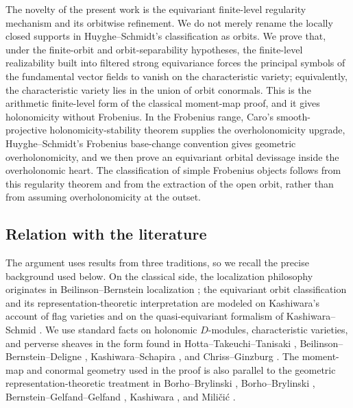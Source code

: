 \documentclass[11pt]{amsart}
\theoremstyle{plain}
\theoremstyle{definition}
\theoremstyle{remark}
\begin{document}
The novelty of the present work is the equivariant finite-level regularity
mechanism and its orbitwise refinement.  We do not merely rename the locally
closed supports in Huyghe--Schmidt's classification as orbits.  We prove that,
under the finite-orbit and orbit-separability hypotheses, the finite-level
realizability built into filtered strong equivariance forces the principal
symbols of the fundamental vector fields to vanish on the characteristic
variety; equivalently, the characteristic variety lies in the union of orbit
conormals.  This is the arithmetic finite-level form of the classical
moment-map proof, and it gives holonomicity without Frobenius.  In the
Frobenius range, Caro's smooth-projective holonomicity-stability theorem
supplies the overholonomicity upgrade, Huyghe--Schmidt's Frobenius base-change
convention gives geometric overholonomicity, and we then prove an equivariant
orbital devissage inside the overholonomic heart.  The classification of simple
Frobenius objects follows from this regularity theorem and from the extraction
of the open orbit, rather than from assuming overholonomicity at the outset.


\subsection*{Relation with the literature}

The argument uses results from three traditions, so we recall the precise background used below.  On the classical side, the localization
philosophy originates in Beilinson--Bernstein localization
\cite[Th\'eor\`eme principal]{BeilinsonBernstein}; the equivariant orbit
classification and its representation-theoretic interpretation are modeled on
Kashiwara's account of flag varieties \cite[Theorem 11.6]{KashiwaraFlag} and on
the quasi-equivariant formalism of Kashiwara--Schmid
\cite[\S1]{KashiwaraSchmid}.  We use standard facts on holonomic
\(D\)-modules, characteristic varieties, and perverse sheaves in the form found
in Hotta--Takeuchi--Tanisaki \cite[Chapters 2--3]{HottaTakeuchiTanisaki},
Beilinson--Bernstein--Deligne \cite[\S1.4]{BBD}, Kashiwara--Schapira
\cite[Chapter VIII]{KashiwaraSchapira}, and Chriss--Ginzburg
\cite[\S1.4]{ChrissGinzburg}.  The moment-map and conormal geometry used in the
proof is also parallel to the geometric representation-theoretic treatment in
Borho--Brylinski \cite[\S2]{BorhoBrylinskiI}, Borho--Brylinski
\cite[\S1]{BorhoBrylinskiII}, Bernstein--Gelfand--Gelfand
\cite[\S3]{BGGDiffOperators}, Kashiwara \cite[\S2]{KashiwaraLieGroups}, and
Mili\v{c}i\'c \cite[\S2]{MilicicDmodules}.
\end{document}
